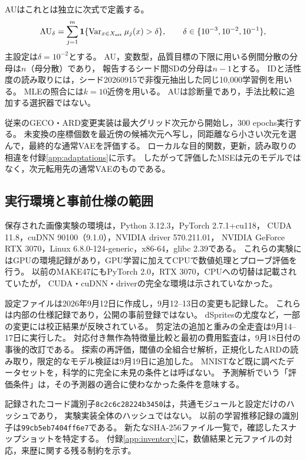 \documentclass[11pt,a4paper]{ltjsarticle}
\begin{document}
AUはこれとは独立に次式で定義する。
\begin{equation}
 \mathrm{AU}_\delta=\sum_{j=1}^{m}
 \mathbf1\{\operatorname{Var}_{x\in X_{\rm est}}\mu_j(x)>\delta\},
 \qquad \delta\in\{10^{-3},10^{-2},10^{-1}\},
 \label{eq:au}
\end{equation}
主設定は$\delta=10^{-2}$とする。
AU，変数型，品質目標の下限に用いる例間分散の分母は$n$（母分散）であり，
報告するシード間SDの分母は$n-1$とする。
IDと活性度の読み取りには，シード20260915で非復元抽出した同じ10,000学習例を用いる。
MLEの照合には$k=10$近傍を用いる。
AUは診断量であり，手法比較に追加する選択器ではない。

従来のGECO・ARD変更実装は最大グリッド次元から開始し，300 epochs実行する。
未変換の座標個数を最近傍の候補次元へ写し，同距離なら小さい次元を選んで，最終的な通常VAEを評価する。
ローカルな目的関数，更新，読み取りの相違を付録\ref{app:adaptations}に示す。
したがって評価したMSEは元のモデルではなく，次元転用先の通常VAEのものである。

\subsection{実行環境と事前仕様の範囲}\label{sec:provenance}
保存された画像実験の環境は，Python 3.12.3，PyTorch 2.7.1+cu118，
CUDA 11.8，cuDNN 90100（9.1.0），NVIDIA driver 570.211.01，
NVIDIA GeForce RTX 3070，Linux 6.8.0-124-generic，x86-64，glibc 2.39である。
これらの実験にはGPUの環境記録があり，GPU学習に加えてCPUで数値処理とプローブ評価を行う。
以前のMAKE47にもPyTorch 2.0，RTX 3070，CPUへの切替は記載されていたが，
CUDA・cuDNN・driverの完全な環境は示されていなかった。

設定ファイルは2026年9月12日に作成し，9月12--13日の変更も記録した。
これらは内部の仕様記録であり，公開の事前登録ではない。
dSpritesの尤度など，一部の変更には校正結果が反映されている。
剪定法の追加と重みの全走査は9月14--17日に実行した。
対応付き無作為特徴量比較と最初の費用監査は，9月18日付の事後的改訂である。
探索の再評価，閾値の全組合せ解析，正規化したARDの読み取り，限定的なモデル検証は9月19日に追加した。
MNISTなど既に調べたデータセットを，科学的に完全に未見の条件とは呼ばない。
予測解析でいう「評価条件」は，その予測器の適合に使わなかった条件を意味する。

記録されたコード識別子\texttt{8c2c6c28224b3450}は，共通モジュールと設定だけのハッシュであり，
実験実装全体のハッシュではない。
以前の学習推移記録の識別子は\texttt{99cb5eb7404ff6e7}である。
新たなSHA-256ファイル一覧で，確認したスナップショットを特定する。
付録\ref{app:inventory}に，数値結果と元ファイルの対応，来歴に関する残る制約を示す。
\end{document}
